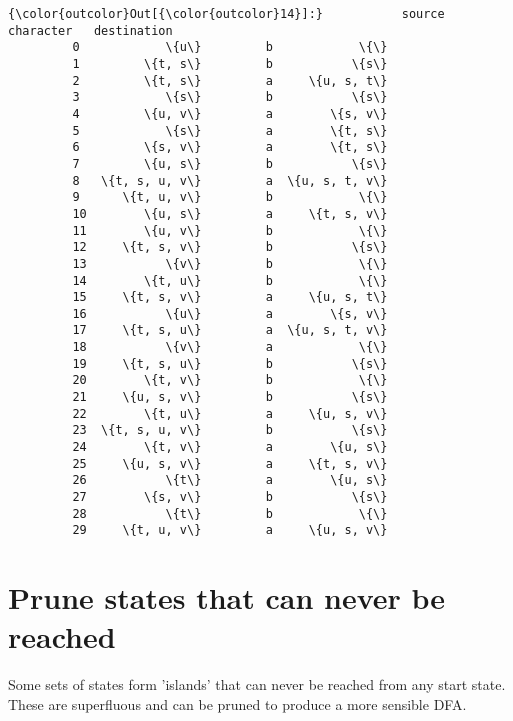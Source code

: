 \documentclass[11pt]{article}
\begin{document}
\begin{Verbatim}[commandchars=\\\{\}]
{\color{outcolor}Out[{\color{outcolor}14}]:}           source character   destination
         0            \{u\}         b            \{\}
         1         \{t, s\}         b           \{s\}
         2         \{t, s\}         a     \{u, s, t\}
         3            \{s\}         b           \{s\}
         4         \{u, v\}         a        \{s, v\}
         5            \{s\}         a        \{t, s\}
         6         \{s, v\}         a        \{t, s\}
         7         \{u, s\}         b           \{s\}
         8   \{t, s, u, v\}         a  \{u, s, t, v\}
         9      \{t, u, v\}         b            \{\}
         10        \{u, s\}         a     \{t, s, v\}
         11        \{u, v\}         b            \{\}
         12     \{t, s, v\}         b           \{s\}
         13           \{v\}         b            \{\}
         14        \{t, u\}         b            \{\}
         15     \{t, s, v\}         a     \{u, s, t\}
         16           \{u\}         a        \{s, v\}
         17     \{t, s, u\}         a  \{u, s, t, v\}
         18           \{v\}         a            \{\}
         19     \{t, s, u\}         b           \{s\}
         20        \{t, v\}         b            \{\}
         21     \{u, s, v\}         b           \{s\}
         22        \{t, u\}         a     \{u, s, v\}
         23  \{t, s, u, v\}         b           \{s\}
         24        \{t, v\}         a        \{u, s\}
         25     \{u, s, v\}         a     \{t, s, v\}
         26           \{t\}         a        \{u, s\}
         27        \{s, v\}         b           \{s\}
         28           \{t\}         b            \{\}
         29     \{t, u, v\}         a     \{u, s, v\}
\end{Verbatim}
            
    \section{Prune states that can never be
reached}\label{prune-states-that-can-never-be-reached}

Some sets of states form 'islands' that can never be reached from any
start state. These are superfluous and can be pruned to produce a more
sensible DFA.
\end{document}
